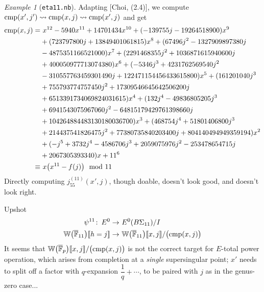 \documentclass{rs}
\theoremstyle{definition}
\theoremstyle{remark}
\newtheorem{ex}[thm]{Example}
\def\co{\colon\thinspace}
\newcommand{\mb}[1]{\mathbb{#1}}
\newcommand{\cF}{\overline {\mb F}}
\newcommand{\cmp}{{\rm cmp}}
\newcommand{\BW}{{\mb W}}
\newcommand{\md}{~~{\rm mod}~}
\newcommand{\lb}{\llbracket}
\newcommand{\rb}{\rrbracket}
\renewcommand{\=}{\approx}
\renewcommand{\-}{\sim}
\numberwithin{equation}{section}
\numberwithin{thm}{section}
\begin{document}
\begin{ex}[\texttt{eta11.nb}]
 Adapting [Choi, (2.4)], we compute $\cmp(x',j') \leadsto \cmp(x,j) \leadsto \cmp(x',j)$ and get 
 \begin{equation*}
  \begin{split}
   \cmp(x,j) = & ~ x^{12}-5940 x^{11}+14701434 x^{10}+(-139755 j-19264518900) x^9 \\
               & +(723797800 j +13849401061815) x^8+(67496 j^2-1327909897380 j \\
               & -4875351166521000) x^7+(2291468355 j^2+1036871615940600 j \\
               & +400050977713074380) x^6+(-5346 j^3+4231762569540 j^2 \\
               & -310557763459301490 j+122471154456433615800) x^5+(161201040 j^3 \\
               & +755793774757450 j^2+17309546645642506200 j \\
               & +6513391734069824031615) x^4+(132 j^4-49836805205 j^3 \\
               & +6941543075967060 j^2-64815179429761398660 j \\
               & +104264884483130180036700) x^3+(468754 j^4+51801406800 j^3 \\
               & +214437541826475 j^2+77380735840203400 j+804140494949359194) x^2 \\
               & +(-j^5+3732 j^4-4586706 j^3+2059075976 j^2-253478654715 j \\
               & +2067305393340) x+11^6 \\
        \equiv & ~ x \big(x^{11} - f(j)\big) \md 11 
  \end{split}
 \end{equation*}
 Directly computing $j_{55}^{(11)}(x',j)$, though doable, doesn't look good, and doesn't look right.  

 Upshot 
 \begin{equation*}
  \begin{split}
                    \psi^{11} \co E^0 \to & ~ E^0(B\Sigma_{11}) / I \\
   \BW\big(\cF_{11}\big)\lb h = j \rb \to & ~ \BW\big(\cF_{11}\big)\lb x,j \rb / \big(\cmp(x,j)\big) 
  \end{split}
 \end{equation*}
 It seems that $\BW\big(\cF_p\big)\lb x,j \rb / \big(\cmp(x,j)\big)$ is not the correct target for $E$-total power operation, 
 which arises from completion at a {\em single} supersingular point; 
 $x'$ needs to split off a factor with $q$-expansion $\dfrac{1}{q} + \cdots$, to be paired with $j$ as in the genus-zero case...  


\end{ex}
\end{document}
